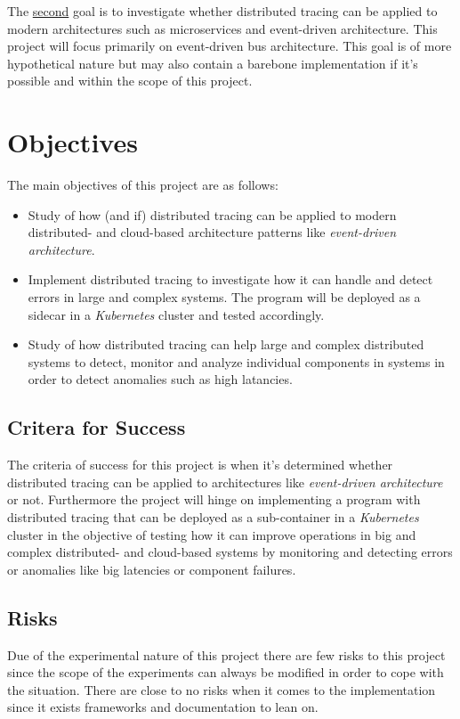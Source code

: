 \documentclass[10pt, titlepage, oneside, a4paper]{article}
\begin{document}
The \underline{second} goal is to investigate whether distributed tracing can be applied to modern architectures such as microservices and event-driven architecture. This project will focus primarily on event-driven bus architecture. This goal is of more hypothetical nature but may also contain a barebone implementation if it's possible and within the scope of this project.



\section{Objectives}

The main objectives of this project are as follows:

\begin{itemize}
    \item Study of how (and if) distributed tracing can be applied to modern distributed- and cloud-based architecture patterns like \textit{event-driven architecture}.
	\item Implement distributed tracing to investigate how it can handle and detect errors in large and complex systems. The program will be deployed as a sidecar in a \textit{Kubernetes} cluster and tested accordingly.
	\item Study of how distributed tracing can help large and complex distributed systems to detect, monitor and analyze individual components in systems in order to detect anomalies such as high latancies. 
\end{itemize}

\subsection{Critera for Success}
The criteria of success for this project is when it's determined whether distributed tracing can be applied to architectures like \textit{event-driven architecture} or not. Furthermore the project will hinge on implementing a program with distributed tracing that can be deployed as a sub-container in a \textit{Kubernetes} cluster in the objective of testing how it can improve operations in big and complex distributed- and cloud-based systems by monitoring and detecting errors or anomalies like big latencies or component failures.



\subsection{Risks}
Due of the experimental nature of this project there are few risks to this project since the scope of the experiments can always be modified in order to cope with the situation. There are close to no risks when it comes to the implementation since it exists frameworks and documentation to lean on.\\
\end{document}
